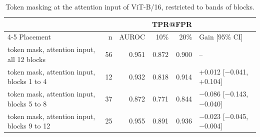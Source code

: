 \begin{table}[htbp]
\centering
\small
\caption{Token masking at the attention input of ViT-B/16, restricted to bands of blocks.}
\label{tab:staircase-bands}
\begin{tabular}{lrrrrl}
\toprule
 & & & \multicolumn{2}{c}{TPR@FPR} & \\
\cmidrule(lr){4-5}
Placement & n & AUROC & 10\% & 20\% & Gain [95\% CI] \\
\midrule
token mask, attention input, all 12 blocks & 56 & 0.951 & 0.872 & 0.900 & -- \\
token mask, attention input, blocks 1 to 4 & 12 & 0.932 & 0.818 & 0.914 & +0.012 [$-$0.041, +0.104] \\
token mask, attention input, blocks 5 to 8 & 37 & 0.872 & 0.771 & 0.844 & $-$0.086 [$-$0.143, $-$0.040] \\
token mask, attention input, blocks 9 to 12 & 25 & 0.955 & 0.891 & 0.936 & $-$0.023 [$-$0.045, $-$0.004] \\
\bottomrule
\end{tabular}
\end{table}
